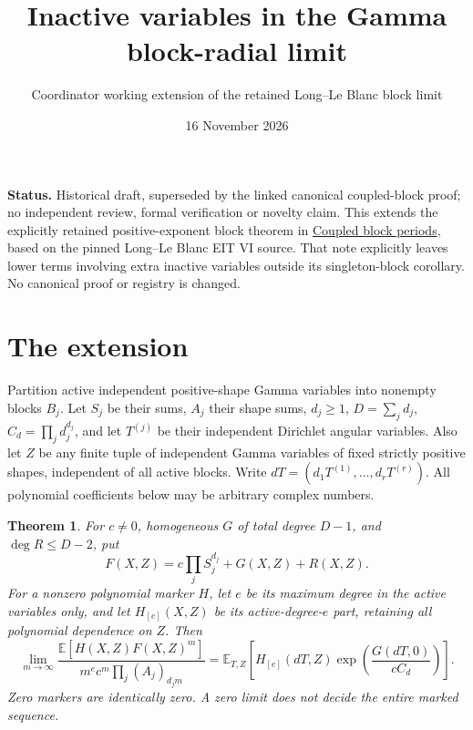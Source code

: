 \documentclass[11pt]{article}
\title{Inactive variables in the Gamma block-radial limit}
\author{Coordinator working extension of the retained Long--Le Blanc block limit}
\date{16 November 2026}
\newtheorem{theorem}{Theorem}
\newcommand{\E}{\mathbb E}
\begin{document}
\maketitle
\noindent\textbf{Status.}
Historical draft, superseded by the linked canonical coupled-block proof; no independent review, formal verification or
novelty claim. This extends the explicitly retained positive-exponent block
theorem in \href{../../../factorial/image-rigidity/COUPLED_BLOCK_PERIODS.tex}
{Coupled block periods}, based on the pinned Long--Le Blanc EIT VI source.
That note explicitly leaves lower terms involving extra inactive variables
outside its singleton-block corollary. No canonical proof or registry is changed.

\section{The extension}
Partition active independent positive-shape Gamma variables into nonempty
blocks $B_j$. Let $S_j$ be their sums, $A_j$ their shape sums,
$d_j\ge1$, $D=\sum_jd_j$, $C_d=\prod_jd_j^{d_j}$, and let $T^{(j)}$ be
their independent Dirichlet angular variables. Also let $Z$ be any finite
tuple of independent Gamma variables of fixed strictly positive shapes,
independent of all active blocks. Write $dT=(d_1T^{(1)},\ldots,d_rT^{(r)})$.
All polynomial coefficients below may be arbitrary complex numbers.

\begin{theorem}
For $c\ne0$, homogeneous $G$ of total degree $D-1$, and
$\deg R\le D-2$, put
\[
 F(X,Z)=c\prod_jS_j^{d_j}+G(X,Z)+R(X,Z).
\]
For a nonzero polynomial marker $H$, let $e$ be its maximum degree in
the active variables only, and let $H_{[e]}(X,Z)$ be its active-degree-$e$
part, retaining all polynomial dependence on $Z$. Then
\[
 \lim_{m\to\infty}
 \frac{\E[H(X,Z)F(X,Z)^m]}
 {m^e c^m\prod_j(A_j)_{d_jm}}
 =
 \E_{T,Z}\left[
 H_{[e]}(dT,Z)
 \exp\!\left(\frac{G(dT,0)}{cC_d}\right)\right].
 \tag{1}
\]
Zero markers are identically zero. A zero limit does not decide the
entire marked sequence.
\end{theorem}
\end{document}
